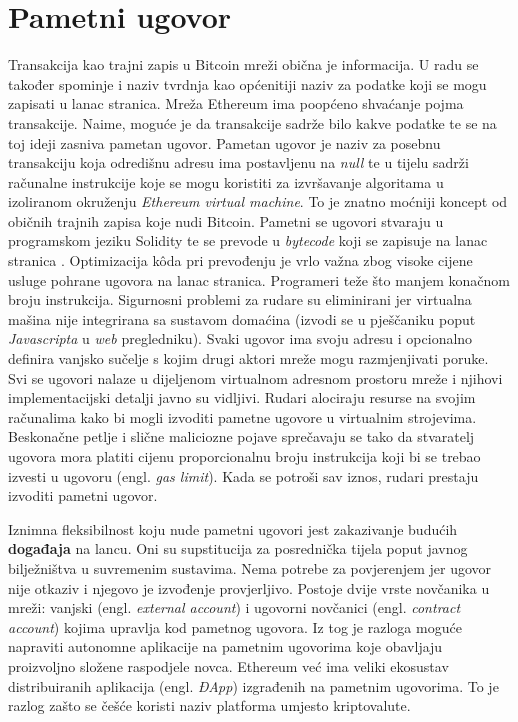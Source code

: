 \documentclass[utf8, zavrsni]{fer}
\begin{document}
\section{Pametni ugovor}
Transakcija kao trajni zapis u Bitcoin mreži obična je informacija. U radu se također spominje i naziv tvrdnja kao općenitiji naziv za podatke koji se mogu zapisati u lanac stranica. Mreža Ethereum ima poopćeno shvaćanje pojma transakcije. Naime, moguće je da transakcije sadrže bilo kakve podatke te se na toj ideji zasniva pametan ugovor. Pametan ugovor je naziv za posebnu transakciju koja odredišnu adresu ima postavljenu na \textit{null} te u tijelu sadrži računalne instrukcije koje se mogu koristiti za izvršavanje algoritama u izoliranom okruženju \textit{Ethereum virtual machine}. To je znatno moćniji koncept od običnih trajnih zapisa koje nudi Bitcoin. Pametni se ugovori stvaraju u programskom jeziku Solidity te se prevode u \textit{bytecode} koji se zapisuje na lanac stranica \cite{wood2014ethereum}. Optimizacija kôda pri prevođenju je vrlo važna zbog visoke cijene usluge pohrane ugovora na lanac stranica. Programeri teže što manjem konačnom broju instrukcija. Sigurnosni problemi za rudare su eliminirani jer virtualna mašina nije integrirana sa sustavom domaćina (izvodi se u pješčaniku poput \textit{Javascripta} u \textit{web} pregledniku). Svaki ugovor ima svoju adresu i opcionalno definira vanjsko sučelje s kojim drugi aktori mreže mogu razmjenjivati poruke. Svi se ugovori nalaze u dijeljenom virtualnom adresnom prostoru mreže i njihovi implementacijski detalji javno su vidljivi. Rudari alociraju resurse na svojim računalima kako bi mogli izvoditi pametne ugovore u virtualnim strojevima. Beskonačne petlje i slične maliciozne pojave sprečavaju se tako da stvaratelj ugovora mora platiti cijenu proporcionalnu broju instrukcija koji bi se trebao izvesti u ugovoru (engl. \textit{gas limit}). Kada se potroši sav iznos, rudari prestaju izvoditi pametni ugovor.

Iznimna fleksibilnost koju nude pametni ugovori jest zakazivanje budućih \textbf{događaja} na lancu. Oni su supstitucija za posrednička tijela poput javnog bilježništva u suvremenim sustavima. Nema potrebe za povjerenjem jer ugovor nije otkaziv i njegovo je izvođenje provjerljivo. Postoje dvije vrste novčanika u mreži: vanjski (engl. \textit{external account}) i ugovorni novčanici (engl. \textit{contract account}) kojima upravlja kod pametnog ugovora. Iz tog je razloga moguće napraviti autonomne aplikacije na pametnim ugovorima koje obavljaju proizvoljno složene raspodjele novca. Ethereum već ima veliki ekosustav distribuiranih aplikacija (engl. \textit{ĐApp}) izgrađenih na pametnim ugovorima. To je razlog zašto se češće koristi naziv platforma umjesto kriptovalute.
\end{document}
